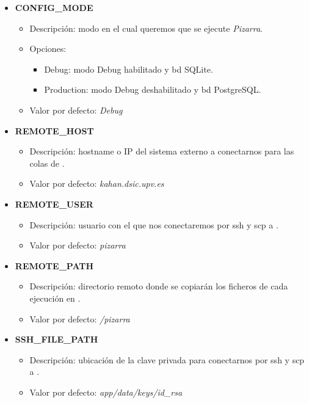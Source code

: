 \documentclass[11pt,spanish,listoffigures,listoftables]{tfgetsinf}
\begin{document}
\begin{itemize}
	\item \textbf{CONFIG\_MODE}
	\begin{itemize}
		\item Descripción: modo en el cual queremos que se ejecute \textit{Pizarra}.
		\item Opciones:
		\begin{itemize}
			\item Debug: modo Debug habilitado y \acrshort{bd} SQLite.
			\item Production: modo Debug deshabilitado y \acrshort{bd} PostgreSQL.
		\end{itemize}
		\item Valor por defecto: \textit{Debug}
	\end{itemize}
\end{itemize}

\begin{itemize}
	\item \textbf{REMOTE\_HOST}
	\begin{itemize}
		\item Descripción: hostname o IP del sistema externo a conectarnos para las colas de \kahan.
		\item Valor por defecto: \textit{kahan.dsic.upv.es}
	\end{itemize}
\end{itemize}

\begin{itemize}
	\item \textbf{REMOTE\_USER}
	\begin{itemize}
		\item Descripción: usuario con el que nos conectaremos por \acrshort{ssh} y \acrshort{scp} a \kahan.
		\item Valor por defecto: \textit{pizarra}
	\end{itemize}
\end{itemize}

\begin{itemize}
	\item \textbf{REMOTE\_PATH}
	\begin{itemize}
		\item Descripción: directorio remoto donde se copiarán los ficheros de cada ejecución en \kahan.
		\item Valor por defecto: \textit{/pizarra}
	\end{itemize}
\end{itemize}

\begin{itemize}
	\item \textbf{SSH\_FILE\_PATH}
	\begin{itemize}
		\item Descripción: ubicación de la clave privada para conectarnos por \acrshort{ssh} y \acrshort{scp} a \kahan.
		\item Valor por defecto: \textit{app/data/keys/id\_rsa}
	\end{itemize}
\end{itemize}
\end{document}

